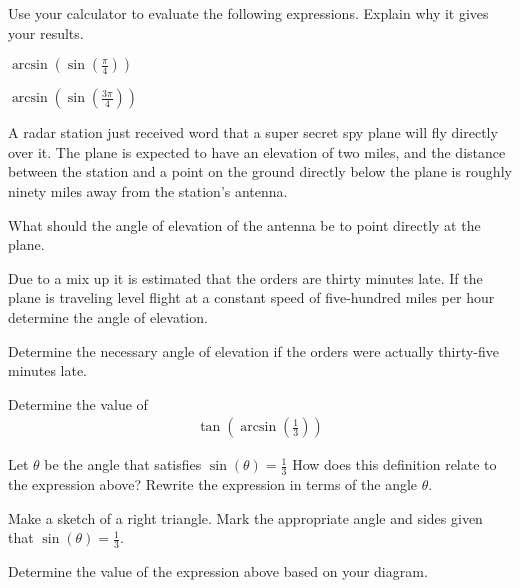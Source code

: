 \begin{problem}
\item Use your calculator to evaluate the following
  expressions. Explain why it gives your results.
  \begin{subproblem}
    \item $\arcsin\left(\sin\left(\frac{\pi}{4}\right)\right)$
      \vfill
    \item $\arcsin\left(\sin\left(\frac{3\pi}{4}\right)\right)$
      \vfill
  \end{subproblem}

  \clearpage

\item A radar station just received word that a super secret spy plane
  will fly directly over it. The plane is expected to have an elevation of
  two miles, and the distance between the station and a point on the ground
  directly below the plane is roughly ninety miles away from the station's antenna.
  \begin{subproblem}
  \item What should the angle of elevation of the antenna be to point directly
    at the plane.
    \vfill
  \item Due to a mix up it is estimated that the orders are thirty minutes late.
    If the plane is traveling level flight at a constant speed of
    five-hundred miles per hour determine the angle of elevation.
    \vfill
  \item Determine the necessary angle of elevation if the orders were actually
    thirty-five minutes late.
    \vfill
  \end{subproblem}

  \vfill

  \clearpage

\item Determine the value of
  \begin{eqnarray*}
    \tan\left(\arcsin\left(\frac{1}{3}\right)\right)
  \end{eqnarray*}

  \begin{subproblem}
  \item Let $\theta$ be the angle that satisfies ${\displaystyle \sin\left(\theta\right)=\frac{1}{3}}$
    How does this definition relate to the expression above? Rewrite the expression in terms of the angle $\theta$.
    \vspace{3em}
  \item Make a sketch of a right triangle. Mark the appropriate angle
    and sides given that ${\displaystyle \sin\left(\theta\right)=\frac{1}{3}}$.
    \vfill
  \item Determine the value of the expression above based on your diagram.
    \vfill
    \vfill
  \end{subproblem}


\end{problem}
